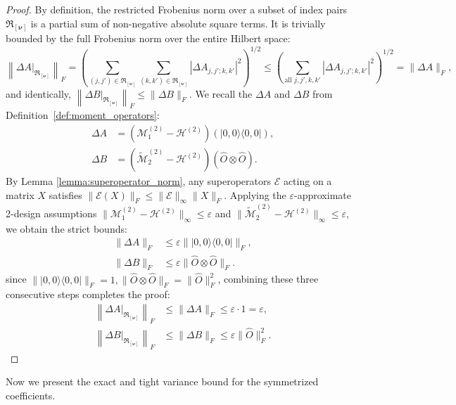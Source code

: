 \documentclass[%
 reprint,
 amsmath,amssymb,
 aps,
 pra,
]{revtex4-2}
\theoremstyle{definition}
\begin{document}
\begin{proof}
By definition, the restricted Frobenius norm over a subset of index pairs $\mathfrak{R}_{[\bm{\nu}]}$ is a partial sum of non-negative absolute square terms. It is trivially bounded by the full Frobenius norm over the entire Hilbert space:
\begin{equation}
\left\| \Delta A |_{\mathfrak{R}_{[\bm{\nu}]}} \right\|_F = \left(\sum_{(j,j') \in \mathfrak{R}_{[\bm{\nu}]}} \sum_{(k,k') \in \mathfrak{R}_{[\bm{\nu}]}} |\Delta A _{j,j';k,k'}|^2\right)^{1/2}\leq \left(\sum_{\text{all } j,j',k,k'} |\Delta A _{j,j';k,k'}|^2\right)^{1/2} = \|\Delta A\|_F,
\end{equation}
and identically, $\left\| \Delta B |_{\mathfrak{R}_{[\bm{\nu}]}} \right\|_F \leq \|\Delta B\|_F$. We recall the $\Delta A$ and $\Delta B$ from Definition~\ref{def:moment_operators}:
\begin{align}
\Delta A &= (\mathcal{M}_1^{(2)} - \mathcal{H}^{(2)})(|0,0\rangle\langle0,0|), \\
\Delta B &= (\widetilde{\mathcal{M}}_2^{(2)} - \mathcal{H}^{(2)})(\hat{O} \otimes \hat{O}).
\end{align}
By Lemma \ref{lemma:superoperator_norm}, any superoperators $\mathcal{E}$ acting on a matrix $X$ satisfies $\|\mathcal{E}(X)\|_F \leq \|\mathcal{E}\|_{\infty} \|X\|_F$. Applying the $\varepsilon$-approximate 2-design assumptions $\| \mathcal{M}^{(2)}_1 - \mathcal{H}^{(2)} \|_{\infty} \leq \varepsilon$ and $\| \widetilde{\mathcal{M}}^{(2)}_2 - \mathcal{H}^{(2)} \|_{\infty} \leq \varepsilon$, we obtain the strict bounds:
\begin{align}
\|\Delta A\|_F &\leq \varepsilon \| |0,0\rangle\langle0,0| \|_F, \\
\|\Delta B\|_F &\leq \varepsilon \| \hat{O} \otimes \hat{O} \|_F.
\end{align}
since $\| |0,0\rangle\langle0,0| \|_F =1,\| \hat{O} \otimes \hat{O} \|_F = \|\hat{O}\|_F^2$, combining these three consecutive steps completes the proof:
\begin{align}
\left\| \Delta A |_{\mathfrak{R}_{[\bm{\nu}]}} \right\|_F &\leq \|\Delta A\|_F \leq \varepsilon \cdot 1 = \varepsilon, \\
\left\| \Delta B |_{\mathfrak{R}_{[\bm{\nu}]}} \right\|_F &\leq \|\Delta B\|_F \leq \varepsilon \|\hat{O}\|_F^2.
\end{align}

\end{proof}

Now we present the exact and tight variance bound for the symmetrized coefficients.
\end{document}
